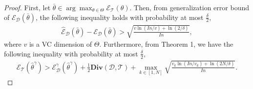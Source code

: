 \begin{proof}
First, let $\bar{\theta}\in\arg\max_{\theta\in\Theta}\mathcal{E}_{\mathcal{T}}(\theta)$. Then, from generalization error bound of $\mathcal{E}_{\mathcal{D}}(\bar{\theta})$, the following inequality holds with probability at most $\frac{\delta}{2}$,
\begin{align}
\hat{\mathcal{E}}_{\mathcal{D}}(\bar{\theta}) - \mathcal{E}_{\mathcal{D}}(\bar{\theta}) > \sqrt{\frac{v\ln\left(In/v\right) + \ln\left(2/\delta\right)}{In}},
\end{align}
where $v$ is a VC dimension of $\Theta$.
Furthermore, from Theorem 1,
 we have the following inequality with probability at most $\frac{\delta}{2}$,
\begin{align}
\mathcal{E}_{\mathcal{T}}(\hat{\theta}^{\gamma}) > \mathcal{E}_{\mathcal{D}}^{\gamma}(\hat{\theta}^{\gamma}) + \frac{1}{2}\mathbf{Div}(\mathcal{D},\mathcal{T}) + \max_{k\in[1,N]} \sqrt{\frac{v_{k}\ln\left(In/v_{k}\right)+\ln(2N/\delta)}{In}}.
\end{align}


\end{proof}
